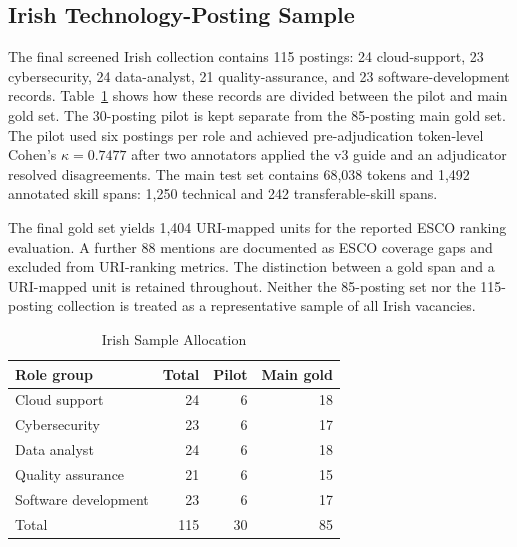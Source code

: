 \documentclass[conference]{IEEEtran}
\begin{document}
\subsection{Irish Technology-Posting Sample}
The final screened Irish collection contains 115 postings: 24 cloud-support, 23 cybersecurity, 24 data-analyst, 21 quality-assurance, and 23 software-development records. Table~\ref{tab:corpus} shows how these records are divided between the pilot and main gold set. The 30-posting pilot is kept separate from the 85-posting main gold set. The pilot used six postings per role and achieved pre-adjudication token-level Cohen's $\kappa=0.7477$ after two annotators applied the v3 guide and an adjudicator resolved disagreements. The main test set contains 68,038 tokens and 1,492 annotated skill spans: 1,250 technical and 242 transferable-skill spans.

The final gold set yields 1,404 URI-mapped units for the reported ESCO ranking evaluation. A further 88 mentions are documented as ESCO coverage gaps and excluded from URI-ranking metrics. The distinction between a gold span and a URI-mapped unit is retained throughout. Neither the 85-posting set nor the 115-posting collection is treated as a representative sample of all Irish vacancies.

\begin{table}[!t]
\caption{Irish Sample Allocation}
\label{tab:corpus}
\centering
\small
\begin{tabular}{lrrr}
\toprule
Role group & Total & Pilot & Main gold \\
\midrule
Cloud support & 24 & 6 & 18 \\
Cybersecurity & 23 & 6 & 17 \\
Data analyst & 24 & 6 & 18 \\
Quality assurance & 21 & 6 & 15 \\
Software development & 23 & 6 & 17 \\
\midrule
Total & 115 & 30 & 85 \\
\bottomrule
\end{tabular}
\\[1mm]
\par\vspace{1mm}{\footnotesize Source: screened Irish posting inventory and final pilot/main-gold split.}
\end{table}
\end{document}
